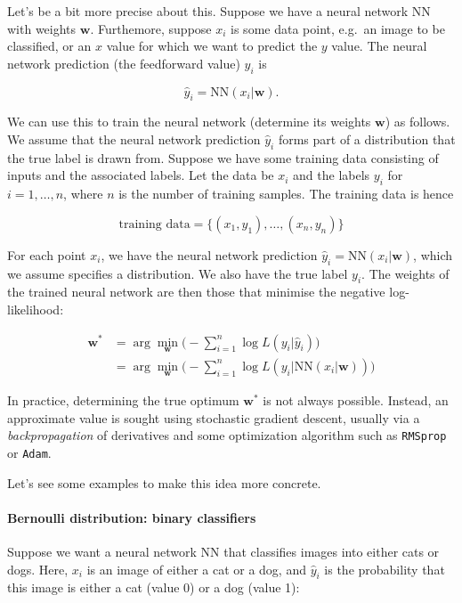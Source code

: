 \documentclass[11pt]{article}
\begin{document}
Let's be a bit more precise about this. Suppose we have a neural network
\(\text{NN}\) with weights \(\mathbf{w}\). Furthemore, suppose \(x_i\)
is some data point, e.g.~an image to be classified, or an \(x\) value
for which we want to predict the \(y\) value. The neural network
prediction (the feedforward value) \(\hat{y}_i\) is

\[
\hat{y}_i = \text{NN}(x_i | \mathbf{w}).
\]

We can use this to train the neural network (determine its weights
\(\mathbf{w}\)) as follows. We assume that the neural network prediction
\(\hat{y}_i\) forms part of a distribution that the true label is drawn
from. Suppose we have some training data consisting of inputs and the
associated labels. Let the data be \(x_i\) and the labels \(y_i\) for
\(i=1, \ldots, n\), where \(n\) is the number of training samples. The
training data is hence

\[
\text{training data} = \{(x_1, y_1), \ldots, (x_n, y_n)\}
\]

For each point \(x_i\), we have the neural network prediction
\(\hat{y}_i = \text{NN}(x_i | \mathbf{w})\), which we assume specifies a
distribution. We also have the true label \(y_i\). The weights of the
trained neural network are then those that minimise the negative
log-likelihood:

\[
\begin{align}
\mathbf{w}^* &= \arg \min_{\mathbf{w}} \big( - \sum_{i=1}^n \log L(y_i | \hat{y}_i) \big) \\
&= \arg \min_{\mathbf{w}} \big( - \sum_{i=1}^n \log L(y_i | \text{NN}(x_i | \mathbf{w})) \big)
\end{align}
\]

In practice, determining the true optimum \(\mathbf{w}^*\) is not always
possible. Instead, an approximate value is sought using stochastic
gradient descent, usually via a \emph{backpropagation} of derivatives
and some optimization algorithm such as \texttt{RMSprop} or
\texttt{Adam}.

Let's see some examples to make this idea more concrete.

    \hypertarget{bernoulli-distribution-binary-classifiers}{%
\paragraph{Bernoulli distribution: binary
classifiers}\label{bernoulli-distribution-binary-classifiers}}

Suppose we want a neural network NN that classifies images into either
cats or dogs. Here, \(x_i\) is an image of either a cat or a dog, and
\(\hat{y}_i\) is the probability that this image is either a cat (value
0) or a dog (value 1):
\end{document}

